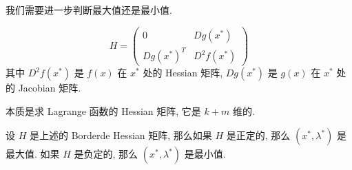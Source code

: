 \begin{note}
    我们需要进一步判断最大值还是最小值.
\end{note}
\begin{definition}
    \begin{equation}
        H = \begin{pmatrix}
            0 & Dg(x^*) \\
            Dg(x^*)^T & D^2 f(x^*)
        \end{pmatrix}
    \end{equation}
    其中 $D^2 f(x^*)$ 是 $f(x)$ 在 $x^*$ 处的 Hessian 矩阵, $Dg(x^*)$ 是 $g(x)$ 在 $x^*$ 处的 Jacobian 矩阵.

    本质是求 Lagrange 函数的 Hessian 矩阵, 它是 $k+m$ 维的.
\end{definition}
\begin{theorem}
    设 $H$ 是上述的 Borderde Hessian 矩阵, 那么如果 $H$ 是正定的, 那么 $(x^*, \lambda^*)$ 是最大值.
    如果 $H$ 是负定的, 那么 $(x^*, \lambda^*)$ 是最小值.
\end{theorem}

%







